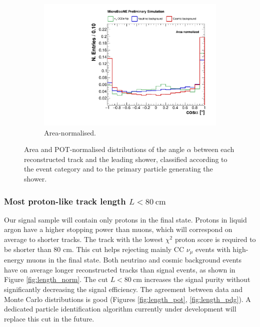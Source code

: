 \begin{figure}[htbp]
    \begin{subfigure}{0.49\textwidth}
    \includegraphics[width=\linewidth]{figures/h_track_shower_angle_norm.pdf}
    \caption{Area-normalised.} \label{fig:angle_integral}
  \end{subfigure}
  \caption{Area and POT-normalised distributions of the angle $\alpha$ between each reconstructed track and the leading shower, classified according to the event category and to the primary particle generating the shower.}
\end{figure}

\subsubsection*{Most proton-like track length $L < 80~\mathrm{cm}$}
Our signal sample will contain only protons in the final state. Protons in liquid argon have a higher stopping power than muons, which will correspond on average to shorter tracks. The track with the lowest $\chi^{2}$ proton score is required to be shorter than 80 cm. This cut helps rejecting mainly CC $\nu_{\mu}$ events with high-energy muons in the final state. 
Both neutrino and cosmic background events have on average longer reconstructed tracks than signal events, as shown in Figure \ref{fig:length_norm}. The cut $L < 80~$cm increases the signal purity without significantly decreasing the signal efficiency. The agreement between data and Monte Carlo distributions is good (Figures \ref{fig:length_pot}, \ref{fig:length_pdg}). A dedicated particle identification algorithm currently under development will replace this cut in the future.

